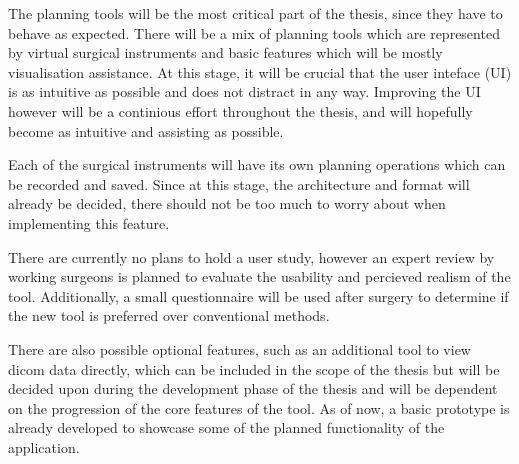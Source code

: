 The planning tools will be the most critical part of the thesis, since they have to behave as expected.
There will be a mix of planning tools which are represented by virtual surgical instruments and basic features which will be mostly visualisation assistance.
At this stage, it will be crucial that the user inteface (UI) is as intuitive as possible and does not distract in any way.
Improving the UI however will be a continious effort throughout the thesis, and will hopefully become as intuitive and assisting as possible.

Each of the surgical instruments will have its own planning operations which can be recorded and saved.
Since at this stage, the architecture and format will already be decided, there should not be too much to worry about when implementing this feature.

There are currently no plans to hold a user study, however an expert review by working surgeons is planned to evaluate the usability and percieved realism of the tool.
Additionally, a small questionnaire will be used after surgery to determine if the new tool is preferred over conventional methods.

There are also possible optional features, such as an additional tool to view dicom data directly, which can be included in the scope of the thesis but will be decided upon during the development phase of the thesis and will be dependent on the progression of the core features of the tool.
As of now, a basic prototype is already developed to showcase some of the planned functionality of the application.